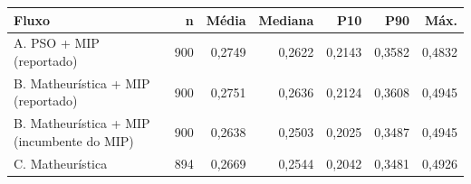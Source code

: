 \begin{tabular}{lrrrrrr}
\toprule
Fluxo & n & Média & Mediana & P10 & P90 & Máx. \\
\midrule
A. PSO + MIP (reportado) & 900 & 0,2749 & 0,2622 & 0,2143 & 0,3582 & 0,4832 \\
B. Matheurística + MIP (reportado) & 900 & 0,2751 & 0,2636 & 0,2124 & 0,3608 & 0,4945 \\
B. Matheurística + MIP (incumbente do MIP) & 900 & 0,2638 & 0,2503 & 0,2025 & 0,3487 & 0,4945 \\
C. Matheurística & 894 & 0,2669 & 0,2544 & 0,2042 & 0,3481 & 0,4926 \\
\bottomrule
\end{tabular}
